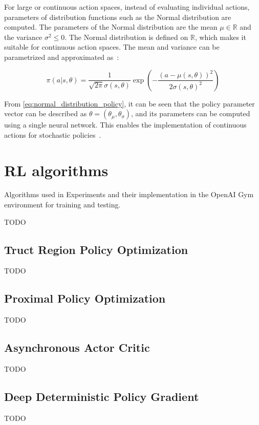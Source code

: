 \documentclass[../xlapes02]{subfiles}
\begin{document}
    For large or continuous action spaces, instead of evaluating individual actions, parameters of distribution functions such as the Normal distribution are computed. The parameters of the Normal distribution are the mean $\mu\in\mathbb{R} $ and the variance $ \sigma^2\leq 0$. The Normal distribution is defined on $\mathbb{R}$, which makes it suitable for continuous action spaces. The mean and variance can be parametrized and approximated as~\cite{sutton2018reinforcement}:

    \begin{equation}
        \label{eq:normal_distribution_policy}
        \pi(a | s, \theta) = \frac{1}{\sqrt{2\pi} \sigma(s, \theta)} \exp\left(-\frac{(a - \mu(s, \theta))^2}{2\sigma(s, \theta)^2}\right) \tag{2.37}
    \end{equation}

    From \cref{eq:normal_distribution_policy}, it can be seen that the policy parameter vector can be described as $ \theta = (\theta_{\mu}, \theta_{\sigma}) $, and its parameters can be computed using a single neural network. This enables the implementation of continuous actions for stochastic policies~\cite{FITMT25127, sutton2018reinforcement, rl-course-david-silver}.


    \section{RL algorithms}
    Algorithms used in Experiments and their implementation in the OpenAI Gym environment for training and testing.

    TODO

    \subsection{Truct Region Policy Optimization}
    TODO

    \subsection{Proximal Policy Optimization}
    TODO

    \subsection{Asynchronous Actor Critic}
    TODO

    \subsection{Deep Deterministic Policy Gradient}
    TODO
\end{document}
